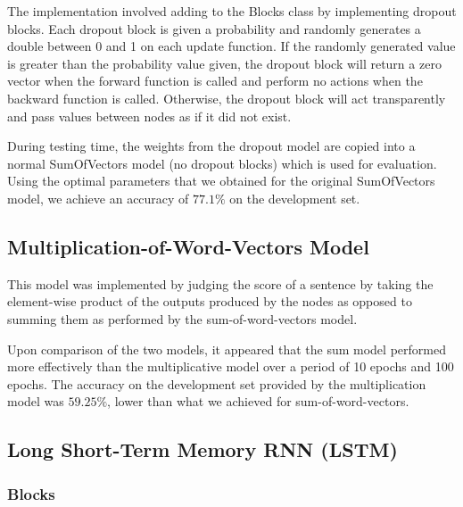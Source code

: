 \documentclass{article} %
\begin{document}
The implementation involved adding to the Blocks class by implementing dropout blocks. Each dropout block is given a probability and randomly generates a double between 0 and 1 on each update function. If the randomly generated value is greater than the probability value given, the dropout block will return a zero vector when the forward function is called and perform no actions when the backward function is called. Otherwise, the dropout block will act transparently and pass values between nodes as if it did not exist.

During testing time, the weights from the dropout model are copied into a normal SumOfVectors model (no dropout blocks) which is used for evaluation. Using the optimal parameters that we obtained for the original SumOfVectors model, we achieve an accuracy of $77.1\%$ on the development set.

\subsection{Multiplication-of-Word-Vectors Model}

This model was implemented by judging the score of a sentence by taking the element-wise product of the outputs produced by the nodes as opposed to summing them as performed by the sum-of-word-vectors model. 

Upon comparison of the two models, it appeared that the sum model performed more effectively than the multiplicative model over a period of 10 epochs and 100 epochs. The accuracy on the development set provided by the multiplication model was $59.25\%$, lower than what we achieved for sum-of-word-vectors.

\subsection{Long Short-Term Memory RNN (LSTM)}

\subsubsection{Blocks}
\end{document}
